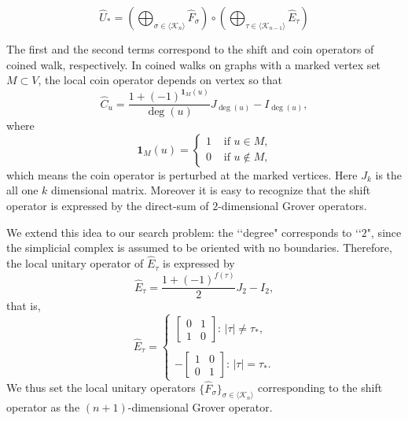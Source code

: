 \documentclass[a4paper,12pt]{article}
\newcommand{\bs}[1]{\boldsymbol{#1}}
\newcommand{\bra}{\langle}
\newcommand{\ket}{\rangle}
\numberwithin{equation}{section}
\begin{document}
\begin{equation}
\label{qs}
\hat U_* = \left( \bigoplus_{ \sigma \in \bra\mathcal{K}_n \ket}\hat{F}_\sigma \right) \circ \left( \bigoplus_{\tau \in \bra \mathcal{K}_{n-1} \ket}\hat{E}_\tau \right)
\end{equation} 
\par
The first and the second terms correspond to the shift and coin operators of coined walk, respectively.
In coined walks on graphs with a marked vertex set $M\subset V$, the local coin operator depends on vertex so that
\begin{equation*}
\hat{C}_u = \frac{1+(-1)^{\bs{1}_{M}(u)}}{\deg(u)}J_{\deg(u)} - I_{\deg(u)},
\end{equation*}
where
\begin{equation*}
{\bs{1}_{M}(u)} = \begin{cases}
	1 & \text{ if $u\in M$,}\\
	0 & \text{ if $u\not \in M$,}
\end{cases}
\end{equation*}
which means the coin operator is perturbed at the marked vertices. Here $J_k$ is the all one $k$ dimensional matrix. 
Moreover it is easy to recognize that the shift operator is expressed by the direct-sum of $2$-dimensional Grover operators. 
\par
We extend this idea to our search problem: the \lq\lq degree" corresponds to \lq\lq $2$", since the simplicial complex is assumed to be oriented with no boundaries.
Therefore, the local unitary operator of $\hat{E}_\tau$ is expressed by
	\[ \hat{E}_\tau=\frac{1+(-1)^{f(\tau)}}{2} J_2-I_2, \] 
that is, 
\begin{equation*}
\label{perturb} 
	\hat{E}_{\tau} = 
  	\begin{cases} 
        \begin{bmatrix} 0 & 1 \\ 1 & 0 \end{bmatrix} \text{: $|\tau|\neq \tau_\ast$}, \\
        \\
        -\begin{bmatrix} 1 & 0 \\ 0 & 1 \end{bmatrix} \text{: $|\tau|= \tau_\ast$}.
        \end{cases}  
\end{equation*}
We thus set the local unitary operators $\{\hat{F}_\sigma\}_{ \sigma \in \bra\mathcal{K}_n \ket}$ corresponding to the shift operator as the $(n+1)$-dimensional Grover operator. 
\end{document}
